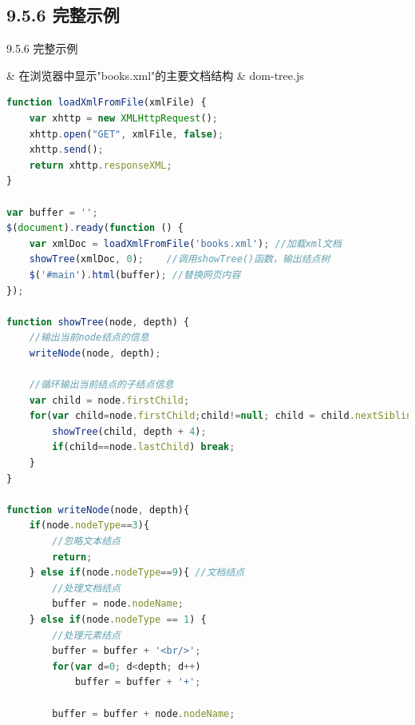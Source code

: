 \subsection{9.5.6 完整示例}
\begin{frame}{9.5.6 完整示例}
\begin{easylist} \easyitem
& 在浏览器中显示"books.xml"的主要文档结构
& dom-tree.js
\begin{lstlisting}[tabsize=8, basicstyle=\small\tt, language=JavaScript]
function loadXmlFromFile(xmlFile) {
    var xhttp = new XMLHttpRequest();
    xhttp.open("GET", xmlFile, false); 
    xhttp.send();
    return xhttp.responseXML; 
}

var buffer = '';
$(document).ready(function () {
    var xmlDoc = loadXmlFromFile('books.xml'); //加载xml文档
    showTree(xmlDoc, 0);    //调用showTree()函数，输出结点树
    $('#main').html(buffer); //替换网页内容
});

function showTree(node, depth) {
    //输出当前node结点的信息
    writeNode(node, depth); 
    
    //循环输出当前结点的子结点信息
    var child = node.firstChild; 
    for(var child=node.firstChild;child!=null; child = child.nextSibling){ 
        showTree(child, depth + 4); 
        if(child==node.lastChild) break; 
    }
}

function writeNode(node, depth){
    if(node.nodeType==3){ 
        //忽略文本结点
        return; 
    } else if(node.nodeType==9){ //文档结点
        //处理文档结点
        buffer = node.nodeName; 
    } else if(node.nodeType == 1) {
        //处理元素结点
        buffer = buffer + '<br/>'; 
        for(var d=0; d<depth; d++) 
            buffer = buffer + '+'; 
            
        buffer = buffer + node.nodeName; 
        

\end{lstlisting}
\end{easylist}
\end{frame}
